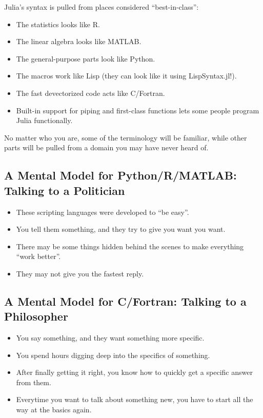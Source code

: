 \documentclass[11pt]{article}
\providecommand{\tightlist}{%
      \setlength{\itemsep}{0pt}\setlength{\parskip}{0pt}}
\begin{document}
Julia's syntax is pulled from places considered ``best-in-class'':

\begin{itemize}
\tightlist
\item
  The statistics looks like R.
\item
  The linear algebra looks like MATLAB.
\item
  The general-purpose parts look like Python.
\item
  The macros work like Lisp (they can look like it using
  LispSyntax.jl!).
\item
  The fast devectorized code acts like C/Fortran.
\item
  Built-in support for piping and first-class functions lets some people
  program Julia functionally.
\end{itemize}

No matter who you are, some of the terminology will be familiar, while
other parts will be pulled from a domain you may have never heard of.

    \hypertarget{a-mental-model-for-pythonrmatlab-talking-to-a-politician}{%
\subsection{A Mental Model for Python/R/MATLAB: Talking to a
Politician}\label{a-mental-model-for-pythonrmatlab-talking-to-a-politician}}

\begin{itemize}
\tightlist
\item
  These scripting languages were developed to ``be easy''.
\item
  You tell them something, and they try to give you want you want.
\item
  There may be some things hidden behind the scenes to make everything
  ``work better''.
\item
  They may not give you the fastest reply.
\end{itemize}

    \hypertarget{a-mental-model-for-cfortran-talking-to-a-philosopher}{%
\subsection{A Mental Model for C/Fortran: Talking to a
Philosopher}\label{a-mental-model-for-cfortran-talking-to-a-philosopher}}

\begin{itemize}
\tightlist
\item
  You say something, and they want something more specific.
\item
  You spend hours digging deep into the specifics of something.
\item
  After finally getting it right, you know how to quickly get a specific
  answer from them.
\item
  Everytime you want to talk about something new, you have to start all
  the way at the basics again.
\end{itemize}
\end{document}
